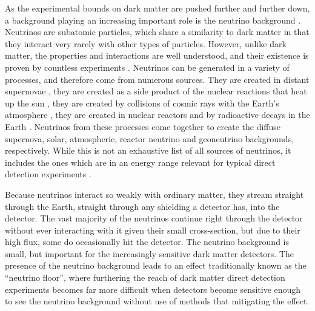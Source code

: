 \documentclass[b5paper, 10pt, twoside]{book}
\begin{document}
As the experimental bounds on dark matter are pushed further and further down, a background playing an increasing important role is the neutrino background \parencites{OHare2016, GaspertGiampaMorrissey2022}. Neutrinos are subatomic particles, which share a similarity to dark matter in that they interact very rarely with other types of particles. However, unlike dark matter, the properties and interactions are well understood, and their existence is proven by countless experiments \parencites{AharmimEtAl2013, AnEtAl2017, BasilicoEtAl2023, AbbasiEtAl2024, AbeEtAl2024, AbratenkoEtAl2024}. Neutrinos can be generated in a variety of processes, and therefore come from numerous sources. They are created in distant supernovae \parencite{Beacom2010}, they are created as a side product of the nuclear reactions that heat up the sun \parencites{BergstromEtAl2016, OrebiGann2021}, they are created by collisions of cosmic rays with the Earth's atmosphere \parencite{BattistoniEtAl2005}, they are created in nuclear reactors \parencites{MuellerEtAl2011, MaEtAl2013} and by radioactive decays in the Earth \parencites{LudhovaZavatarelli2013, HuangEtAl2013}. Neutrinos from these processes come together to create the diffuse supernova, solar, atmospheric, reactor neutrino and geoneutrino backgrounds, respectively. While this is not an exhaustive list of all sources of neutrinos, it includes the ones which are in an energy range relevant for typical direct detection experiments \parencite{VitaglianoTamborraRaffelt2020}.

Because neutrinos interact so weakly with ordinary matter, they stream straight through the Earth, straight through any shielding a detector has, into the detector. The vast majority of the neutrinos continue right through the detector without ever interacting with it given their small cross-section, but due to their high flux, some do occasionally hit the detector. The neutrino background is small, but important for the increasingly sensitive dark matter detectors. The presence of the neutrino background leads to an effect traditionally known as the ``neutrino floor'', where furthering the reach of dark matter direct detection experiments becomes far more difficult when detectors become sensitive enough to see the neutrino background without use of methods that mitigating the effect.
\end{document}
